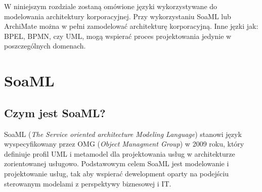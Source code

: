 W niniejszym rozdziale zostaną omówione języki wykorzystywane do modelowania architektury korporacyjnej. Przy wykorzystaniu SoaML lub ArchiMate można w pełni zamodelować architekturę korporacyjną. Inne jęzki jak: BPEL, BPMN, czy UML, mogą wspierać proces projektowania jedynie w poszczególnych domenach.

\section{SoaML}
\subsection{Czym jest SoaML?}
SoaML (\emph{The Service oriented architecture Modeling Language}) stanowi język wyspecyfikowany przez OMG (\emph{Object Managment Group}) w 2009 roku, który definiuje profil UML i metamodel dla projektowania usług w architekturze zorientowanej usługowo. Podstawowym celem SoaML jest modelowanie i projektowanie usług, tak aby wspierać dewelopment oparty na podejściu sterowanym modelami z perspektywy biznesowej i IT.


